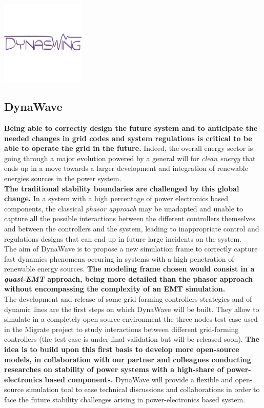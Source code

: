 \documentclass[a4paper, 12pt]{report}
\begin{document}
\begin{center}
\includegraphics[width=0.3\textwidth]{../resources/DynaSwing.png}
\end{center}

\newpage
\subsection{DynaWave}

\textbf{Being able to correctly design the future system and to anticipate the needed changes in grid codes and system regulations is critical to be able to operate the grid in the future.} Indeed, the overall energy sector is going through a major evolution powered by a general will for \textit{clean energy} that ends up in a move towards a larger development and integration of renewable energies sources in the power system. \\

\textbf{The traditional stability boundaries are challenged by this global change.} In a system with a high percentage of power electronics based components, the classical \textit{phasor approach} may be unadapted and unable to capture all the possible interactions between the different controllers themselves and between the controllers and the system, leading to inappropriate control and regulations designs that can end up in future large incidents on the system. \\

The aim of DynaWave is to propose a new simulation frame to correctly capture fast dynamics phenomena occuring in systems with a high penetration of renewable energy sources. \textbf{The modeling frame chosen would consist in a \textit{quasi-EMT} approach, being more detailed than the phasor approach without encompassing the complexity of an EMT simulation.} \\

The development and release of some grid-forming controllers strategies and of dynamic lines are the first steps on which DynaWave will be built. They allow to simulate in a completely open-source environment the three nodes test case used in the Migrate project to study interactions between different grid-forming controllers (the test case is under final validation but will be released soon). \textbf{The idea is to build upon this first basis to develop more open-source models, in collaboration with our partner and colleagues conducting researches on stability of power systems with a high-share of power-electronics based components.} DynaWave will provide a flexible and open-source simulation tool to ease technical discussions and collaborations in order to face the future stability challenges arising in power-electronics based system.
\end{document}
